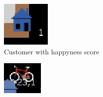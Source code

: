 \begin{figure}
     \centering
     \begin{subfigure}[m]{0.1\textwidth}
         \centering
         \includegraphics[width=\textwidth]{sections/pics/cust_happy}
         \caption{Customer with happyness score}
     \end{subfigure}
     \hfill
     \begin{subfigure}[m]{0.1\textwidth}
         \centering
         \includegraphics[width=\textwidth]{sections/pics/del_on_its_way}

\end{subfigure}
\end{figure}
